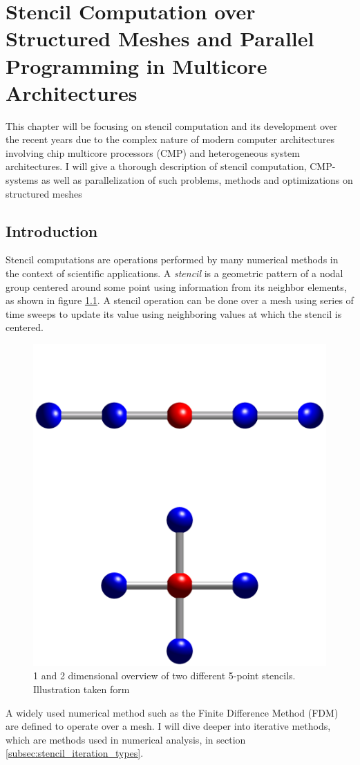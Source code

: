 \chapter{Stencil Computation over Structured Meshes and Parallel Programming in Multicore Architectures}
This chapter will be focusing on stencil computation and its development over the recent years due to the complex nature of modern computer architectures involving chip multicore processors (CMP) and heterogeneous system architectures. I will give a thorough description of stencil computation, CMP-systems as well as parallelization of such problems, methods and optimizations on structured meshes

\section{Introduction}
Stencil computations are operations performed by many numerical methods in the context of scientific  applications. A \textit{stencil} is a geometric pattern of a nodal group centered around some point using information from its neighbor elements, as shown in figure \ref{I_Five_point_stencil_illustration.png}. A stencil operation can be done over a mesh using series of time sweeps to update its value using neighboring values at which the stencil is centered.
\begin{figure}[h]
 \centering 
     \includegraphics[height=0.5\textwidth]{bilder/I_Five_point_stencil_illustration}
     \caption{1 and 2 dimensional overview of two different 5-point stencils. Illustration taken form \cite{pic1}
     \label{I_Five_point_stencil_illustration.png}}
\end{figure}
A widely used numerical method such as the Finite Difference Method (FDM) are defined to operate over a mesh. I will dive deeper into iterative methods, which are methods used in numerical analysis, in section \ref{subsec:stencil_iteration_types}. 

